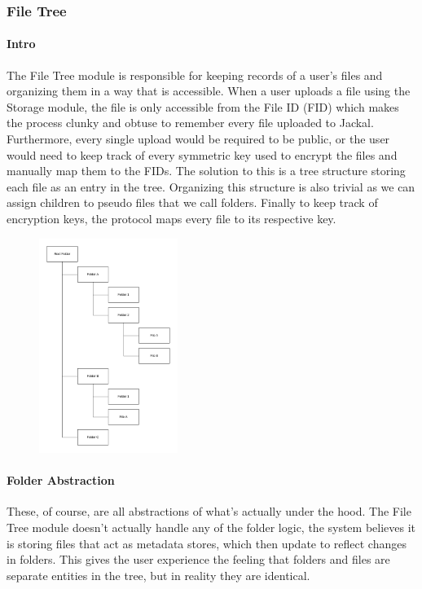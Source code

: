 \documentclass[a4paper]{article}
\begin{document}
\newpage
\subsubsection{File Tree}
\paragraph{Intro}
The File Tree module is responsible for keeping records of a user's files and organizing them in a way that is accessible. When a user uploads a file using the Storage module, the file is only accessible from the File ID (FID) which makes the process clunky and obtuse to remember every file uploaded to Jackal. Furthermore, every single upload would be required to be public, or the user would need to keep track of every symmetric key used to encrypt the files and manually map them to the FIDs. The solution to this is a tree structure storing each file as an entry in the tree. Organizing this structure is also trivial as we can assign children to pseudo files that we call folders. Finally to keep track of encryption keys, the protocol maps every file to its respective key.

\begin{figure}[!htbp]
\centering
\includegraphics[width=0.4\textwidth]{assets/filetree1.png}
\caption{}
\end{figure}

\paragraph{Folder Abstraction}
These, of course, are all abstractions of what's actually under the hood. The File Tree module doesn't actually handle any of the folder logic, the system believes it is storing files that act as metadata stores, which then update to reflect changes in folders. This gives the user experience the feeling that folders and files are separate entities in the tree, but in reality they are identical.
\end{document}
